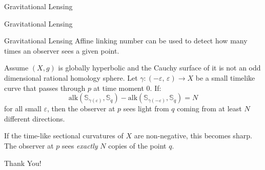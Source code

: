 \documentclass{beamer}
\begin{document}
    \begin{frame}{Gravitational Lensing}
        \begin{figure}
            \centering
        \end{figure}
    \end{frame}
    \begin{frame}{Gravitational Lensing}
        \begin{figure}
            \centering
        \end{figure}
    \end{frame}
    \begin{frame}{Gravitational Lensing}
        Affine linking number can be used to detect how many times an observer
        sees a given point.
        \begin{theorem}
            Assume $(X, g)$ is globally hyperbolic and the Cauchy surface
            of it is not an odd dimensional rational homology sphere.
            Let $\gamma:(-\varepsilon,\,\varepsilon)\rightarrow{X}$
            be a small timelike curve that passes through $p$ at time moment 0.
            If:
            \begin{equation}
                \textrm{alk}(\mathbb{S}_{\gamma(\varepsilon)}, \mathbb{S}_{q})-
                \textrm{alk}(\mathbb{S}_{\gamma(-\varepsilon)}, \mathbb{S}_{q})
                =N
            \end{equation}
            for all small $\varepsilon$, then the observer at $p$ sees light
            from $q$ coming from at least $N$ different directions.
        \end{theorem}
        If the time-like sectional curvatures of $X$ are non-negative, this
        becomes sharp. The observer at $p$ sees \textit{exactly} $N$ copies of
        the point $q$.
    \end{frame}
    \begin{frame}
        \begin{center}
            Thank You!
        \end{center}
    \end{frame}
\end{document}
